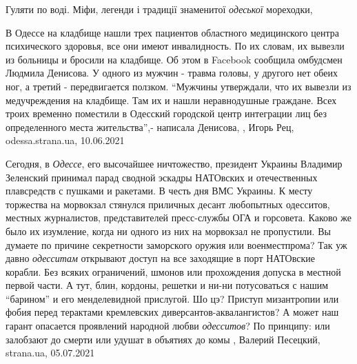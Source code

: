  
 
 
 
 
Гуляти по воді. Міфи, легенди і традиції знаменитої \emph{одеської} мореходки,

В Одессе на кладбище нашли трех пациентов областного медицинского центра
психического здоровья, все они имеют инвалидность. По их словам, их вывезли из
больницы и бросили на кладбище.  Об этом в Facebook сообщила омбудсмен Людмила
Денисова.  У одного из мужчин - травма головы, у другого нет обеих ног, а
третий - передвигается ползком.  \enquote{Мужчины утверждали, что их вывезли из
медучреждения на кладбище. Там их и нашли неравнодушные граждане. Всех троих
временно поместили в Одесский городской центр интеграции лиц без определенного
места жительства},- написала Денисова,
, Игорь Рец, odessa.strana.ua, 10.06.2021

Сегодня, в \emph{Одессе}, его высочайшее ничтожество, президент Украины
Владимир Зеленский принимал парад сводной эскадры НАТОвских и отечественных
плавсредств с пушками и ракетами. В честь дня ВМС Украины. К месту торжества на
морвокзал стянулся приличных десант любопытных одесситов, местных журналистов,
представителей пресс-службы ОГА и горсовета. Каково же было их изумление, когда
ни одного из них на морвокзал не пропустили. Вы думаете по причине секретности
заморского оружия или военместпрома? Так уж давно \emph{одесситам} открывают доступ на
все заходящие в порт НАТОвские корабли. Без всяких ограничений, шмонов или
прохождения допуска в местной первой части. А тут, блин, кордоны, решетки и
ни-ни потусоваться с нашим \enquote{барином} и его менделевидной прислугой. Шо
цэ? Приступ мизантропии или фобия перед терактами кремлевских
диверсантов-аквалангистов? А может наш гарант опасается проявлений народной
любви \emph{одесситов}? По принципу: или залобзают до смерти или удушат в
объятиях до комы
, 
Валерий Песецкий, strana.ua, 05.07.2021

